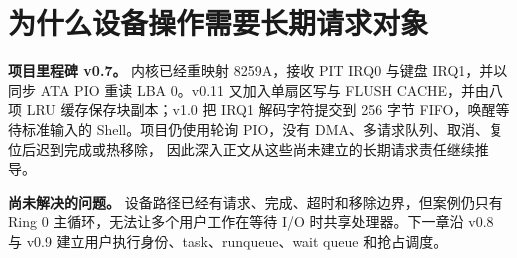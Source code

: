 \chapter{为什么设备操作需要长期请求对象}

\begin{statebox}
\textbf{项目里程碑 v0.7。} 内核已经重映射 8259A，接收 PIT IRQ0 与键盘 IRQ1，并以
同步 ATA PIO 重读 LBA 0。v0.11 又加入单扇区写与 FLUSH CACHE，并由八项 LRU
缓存保存块副本；v1.0 把 IRQ1 解码字符提交到 256 字节 FIFO，唤醒等待标准输入的
Shell。项目仍使用轮询 PIO，没有 DMA、多请求队列、取消、复位后迟到完成或热移除，
因此深入正文从这些尚未建立的长期请求责任继续推导。
\end{statebox}


\begin{problemframe}
\textbf{尚未解决的问题。} 设备路径已经有请求、完成、超时和移除边界，但案例仍只有
Ring 0 主循环，无法让多个用户工作在等待 I/O 时共享处理器。下一章沿 v0.8 与 v0.9
建立用户执行身份、task、runqueue、wait queue 和抢占调度。
\end{problemframe}
